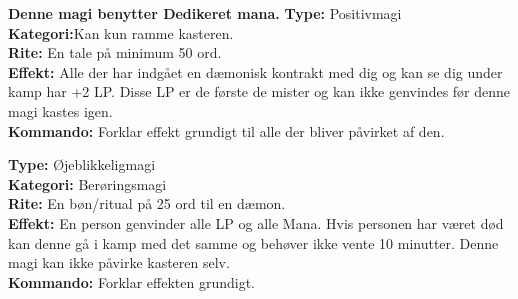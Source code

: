 \begin{falden*}
\textbf{Denne magi benytter Dedikeret mana.}
\textbf{Type:} Positivmagi\\
\textbf{Kategori:}Kan kun ramme kasteren.\\
\textbf{Rite:} En tale på minimum 50 ord.\\
\textbf{Effekt:} Alle der har indgået en dæmonisk kontrakt med dig og kan se dig under kamp har +2 LP. Disse LP er de første de mister og kan ikke genvindes før denne magi kastes igen.\\
\textbf{Kommando:} Forklar effekt grundigt til alle der bliver påvirket af den.
\end{falden*}

\begin{falden*}
\textbf{Type:} Øjeblikkeligmagi\\
\textbf{Kategori:} Berøringsmagi\\
\textbf{Rite:} En bøn/ritual på 25 ord til en dæmon.\\
\textbf{Effekt:} En person genvinder alle LP og alle Mana. Hvis personen har været død kan denne gå i kamp med det samme og behøver ikke vente 10 minutter. Denne magi kan ikke påvirke kasteren selv.\\
\textbf{Kommando:} Forklar effekten grundigt.
\end{falden*}